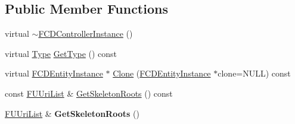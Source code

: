 \subsection*{Public Member Functions}
\begin{DoxyCompactItemize}
\item 
virtual \hyperlink{classFCDControllerInstance_aade7a868f4c9154480f950553280e22f}{$\sim$FCDControllerInstance} ()
\item 
virtual \hyperlink{classFCDEntityInstance_a82e95eec7d9242bbedb336b0d35b59d3}{Type} \hyperlink{classFCDControllerInstance_a5c8057a1560e6b77340218e5d1e0d4ef}{GetType} () const 
\item 
virtual \hyperlink{classFCDEntityInstance}{FCDEntityInstance} $\ast$ \hyperlink{classFCDControllerInstance_a754a4004c6d4f4c72c1639f79138799a}{Clone} (\hyperlink{classFCDEntityInstance}{FCDEntityInstance} $\ast$clone=NULL) const 
\item 
const \hyperlink{classfm_1_1vector}{FUUriList} \& \hyperlink{classFCDControllerInstance_af3d8c893a4bd43eec2ec413e82f31be3}{GetSkeletonRoots} () const 
\item 
\hypertarget{classFCDControllerInstance_af8e2620bc755e7abcb01b63ced3c62bc}{
\hyperlink{classfm_1_1vector}{FUUriList} \& {\bfseries GetSkeletonRoots} ()}
\label{classFCDControllerInstance_af8e2620bc755e7abcb01b63ced3c62bc}


\end{DoxyCompactItemize}
